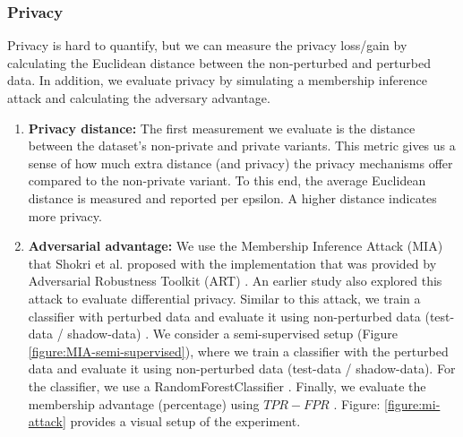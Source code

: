 \subsubsection{Privacy}
Privacy is hard to quantify, but we can measure the privacy loss/gain by calculating the Euclidean distance between the non-perturbed and perturbed data.
In addition, we evaluate privacy by simulating a membership inference attack and calculating the adversary advantage.
\begin{enumerate}
  \item \textbf{Privacy distance: }
        The first measurement we evaluate is the distance between the dataset's non-private and private variants.
        This metric gives us a sense of how much extra distance (and privacy) the privacy mechanisms offer compared to the non-private variant.
        To this end, the average Euclidean distance is measured and reported per epsilon. A higher distance indicates more privacy.
  \item \textbf{Adversarial advantage: }
        We use the Membership Inference Attack (MIA) that Shokri et al. proposed with the implementation that was provided by Adversarial Robustness Toolkit (ART) \citep{nicolae_adversarial_2019}.
        An earlier study also explored this attack to evaluate differential privacy.
        Similar to this attack, we train a classifier with perturbed data and evaluate it using non-perturbed data (test-data / shadow-data) \citep{zhao_not_2020}.
        We consider a semi-supervised setup (Figure \ref{figure:MIA-semi-supervised}), where we train a classifier with the perturbed data and evaluate it using non-perturbed data (test-data / shadow-data).
        For the classifier, we use a RandomForestClassifier \citep{rigaki_survey_2021}.
        Finally, we evaluate the membership advantage (percentage) using $TPR - FPR$ \citep{yeom_privacy_2018}.
        Figure: \ref{figure:mi-attack} provides a visual setup of the experiment.


\end{enumerate}
